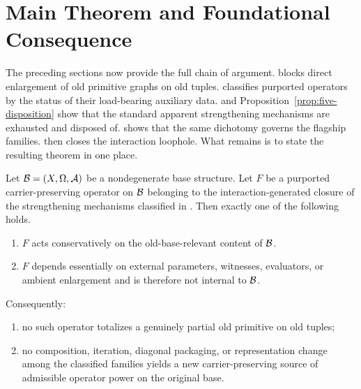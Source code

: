 \section{Main Theorem and Foundational Consequence}\label{sec:main-theorem}

The preceding sections now provide the full chain of argument.  blocks direct enlargement of old primitive graphs on old tuples.  classifies purported operators by the status of their load-bearing auxiliary data.  and Proposition~\ref{prop:five-disposition} show that the standard apparent strengthening mechanisms are exhausted and disposed of.  shows that the same dichotomy governs the flagship families.  then closes the interaction loophole. What remains is to state the resulting theorem in one place.

\begin{theorem}\label{thm:main-no-new-power}
Let $\mathcal{B}=(X,\Omega,\mathcal{A})$ be a nondegenerate base structure. Let $F$ be a purported carrier-preserving operator on $\mathcal{B}$ belonging to the interaction-generated closure of the strengthening mechanisms classified in . Then exactly one of the following holds.
\begin{enumerate}[label=(\alph*)]
    \item $F$ acts conservatively on the old-base-relevant content of $\mathcal{B}$.
    \item $F$ depends essentially on external parameters, witnesses, evaluators, or ambient enlargement and is therefore not internal to $\mathcal{B}$.
\end{enumerate}
Consequently:
\begin{enumerate}[label=(\roman*)]
    \item no such operator totalizes a genuinely partial old primitive on old tuples;
    \item no composition, iteration, diagonal packaging, or representation change among the classified families yields a new carrier-preserving source of admissible operator power on the original base.
\end{enumerate}
\end{theorem}

